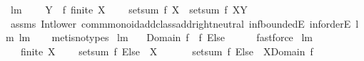 \begin{isabellebody}
\endisatagproof
{\isafoldproof}%
%
\isadelimproof
\isanewline
%
\endisadelimproof
\isanewline
{}\isamarkupfalse%
\ lm{}{}{}{\isacharcolon}\ \isanewline
\ \ \ {\isachardoublequoteopen}Y\ {\isasymsubseteq}\ f{\isacharminus}{\isacharbackquote}{\isacharbraceleft}{}{\isacharbraceright}{\isachardoublequoteclose}\ {\isachardoublequoteopen}finite\ X{\isachardoublequoteclose}\ \isanewline
\ \ \ {\isachardoublequoteopen}setsum\ f\ X\ {\isacharequal}\ setsum\ f\ {\isacharparenleft}X{\isacharminus}Y{\isacharparenright}{\isachardoublequoteclose}\ \isanewline
%
\isadelimproof
\ \ %
\endisadelimproof
%
\isatagproof
{}\isamarkupfalse%
\ assms\ Int{\isacharunderscore}lower{}\ comm{\isacharunderscore}monoid{\isacharunderscore}add{\isacharunderscore}class{\isachardot}add{\isachardot}right{\isacharunderscore}neutral\ inf{\isachardot}boundedE\ inf{\isachardot}orderE\ lm{}{}{}\ lm{}{}{}\isanewline
\ \ \isamarkupfalse%
\ {\isacharparenleft}metis{\isacharparenleft}no{\isacharunderscore}types{\isacharparenright}{\isacharparenright}%
\endisatagproof
{\isafoldproof}%
%
\isadelimproof
\isanewline
%
\endisadelimproof
\isanewline
\isanewline
{}\isamarkupfalse%
\ lm{}{}{}{\isacharcolon}\ \isanewline
\ \ {\isachardoublequoteopen}{\isacharminus}{\isacharparenleft}Domain\ f{\isacharparenright}\ {\isasymsubseteq}\ {\isacharparenleft}f\ Else\ {}{\isacharparenright}{\isacharminus}{\isacharbackquote}{\isacharbraceleft}{}{\isacharbraceright}{\isachardoublequoteclose}\ \isanewline
%
\isadelimproof
\ \ %
\endisadelimproof
%
\isatagproof
{}\isamarkupfalse%
\ fastforce%
\endisatagproof
{\isafoldproof}%
%
\isadelimproof
\isanewline
%
\endisadelimproof
\isanewline
{}\isamarkupfalse%
\ lm{}{}{}{\isacharcolon}\ \isanewline
\ \ \ {\isachardoublequoteopen}finite\ X{\isachardoublequoteclose}\ \isanewline
\ \ \ {\isachardoublequoteopen}setsum\ {\isacharparenleft}f\ Else\ {}{\isacharparenright}\ X\ \ \ \ {\isacharequal}\ \ \ setsum\ {\isacharparenleft}f\ Else\ {}{\isacharparenright}\ {\isacharparenleft}X{\isasyminter}Domain\ f{\isacharparenright}{\isachardoublequoteclose}\ \isanewline
%
\isadelimproof
%
\endisadelimproof
%
\isatagproof
{}\isamarkupfalse%
\ {\isacharminus}\ \isanewline

\end{isabellebody}
